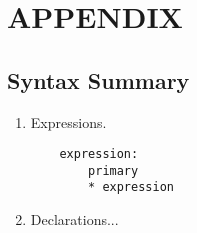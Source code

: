 \documentclass[12pt,a4paper]{article}
\begin{document}
\appendix
\section*{APPENDIX}
\subsection*{Syntax Summary}

\begin{enumerate}
    \item Expressions.
    \begin{verbatim}
    expression:
        primary
        * expression
    \end{verbatim}
    \item Declarations...
\end{enumerate}
\end{document}
